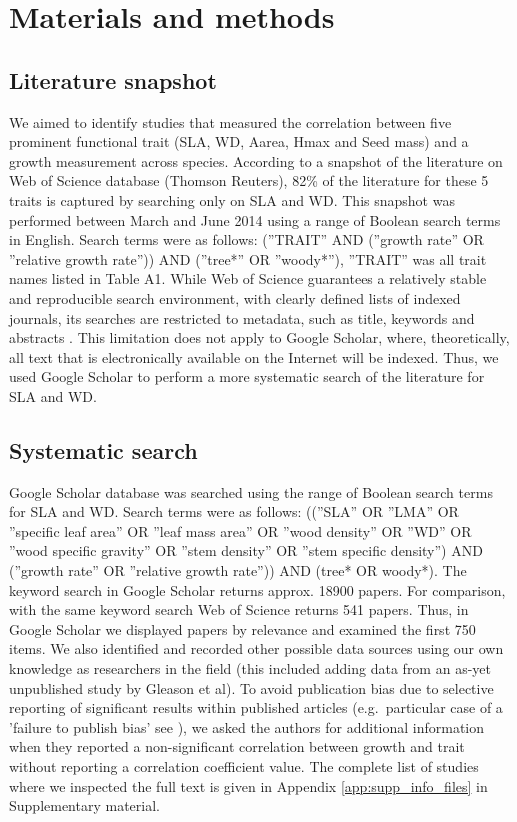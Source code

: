 \documentclass[a4paper]{article}\usepackage[]{graphicx}\usepackage[]{color}
\begin{document}
\section*{Materials and methods}\label{material-and-methods}

\subsection*{Literature snapshot}\label{literature-snapshot}
We aimed to identify studies that measured the correlation between five prominent functional trait (SLA, WD, Aarea, Hmax and Seed mass) and a growth measurement across species. According to a snapshot of the literature on Web of Science database (Thomson Reuters), 82\% of the literature for these 5 traits is captured by searching only on SLA and WD. This snapshot was performed between March and June 2014 using a range of Boolean search terms in English. Search terms were as follows: (''TRAIT'' AND (''growth rate'' OR ''relative growth rate'')) AND (''tree*'' OR ''woody*''), ''TRAIT'' was all trait names listed in Table A1. While Web of Science guarantees a relatively stable and reproducible search environment, with clearly defined lists of indexed journals, its searches are restricted to metadata, such as title, keywords and abstracts \citep{Beckmann:2012hn}. This limitation does not apply to Google Scholar, where, theoretically, all text that is electronically available on the Internet will be indexed. Thus, we used Google Scholar to perform a more systematic search of the literature for SLA and WD.

\subsection*{Systematic search}\label{systematic-search}
Google Scholar database was searched using the range of Boolean search terms for SLA and WD. Search terms were as follows: ((''SLA'' OR ''LMA'' OR ''specific leaf area'' OR ''leaf mass area'' OR ''wood density'' OR ''WD'' OR ''wood specific gravity'' OR ''stem density'' OR ''stem specific density'') AND (''growth rate'' OR ''relative growth rate'')) AND (tree* OR woody*). The keyword search in Google Scholar returns approx. 18900 papers. For comparison, with the same keyword search Web of Science returns 541 papers. Thus, in Google Scholar we displayed papers by relevance and examined the first 750 items. We also identified and recorded other possible data sources using our own knowledge as researchers in the field (this included adding data from an as-yet unpublished study by Gleason et al). To avoid publication bias due to selective reporting of significant results within published articles (e.g.~particular case of a 'failure to publish bias' see \citealt{Jennions:2013ta}), we asked the authors for additional information when they reported a non-significant correlation between growth and trait without reporting a correlation coefficient value. The complete list of studies where we inspected the full text is given in Appendix \ref{app:supp_info_files} in Supplementary material.
\end{document}
